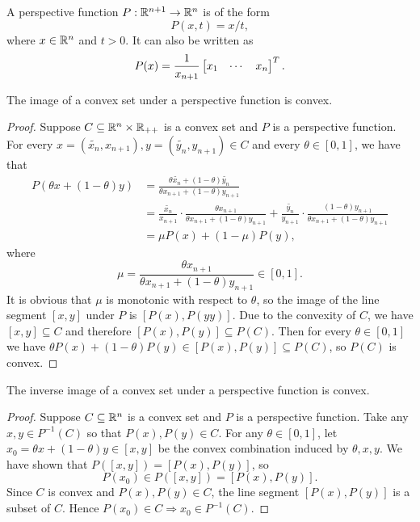 \documentclass[12pt]{article}
\begin{document}
\begin{definition}
    A \textnormal{perspective function} \(P:\mathbb R^{n+1}\to\mathbb R^n\) is of the form
    \[P(x,t)=x/t,\]
    where \(x\in\mathbb R^n\) and \(t>0\). It can also be written as
    \[P(x)=\frac{1}{x_{n+1}}\begin{bmatrix}x_1 & \cdots & x_n\end{bmatrix}^T.\]
\end{definition}

\begin{proposition}
    The image of a convex set under a perspective function is convex.
\end{proposition}
\begin{proof}
    Suppose \(C\subseteq\mathbb R^n\times\mathbb R_{++}\) is a convex set and \(P\) is a perspective function. For every \(x=\left(\tilde{x_n},x_{n+1}\right),y=\left(\tilde{y_n},y_{n+1}\right)\in C\) and every \(\theta\in[0,1]\), we have that
    \[\begin{aligned}
        P(\theta x+(1-\theta)y)
        &=\frac{\theta\tilde{x_n}+(1-\theta)\tilde{y_n}}{\theta x_{n+1}+(1-\theta)y_{n+1}}\\
        &=\frac{\tilde{x_n}}{x_{n+1}}\cdot\frac{\theta x_{n+1}}{\theta x_{n+1}+(1-\theta)y_{n+1}}+\frac{\tilde{y_n}}{y_{n+1}}\cdot\frac{(1-\theta)y_{n+1}}{\theta x_{n+1}+(1-\theta)y_{n+1}}\\
        &=\mu P(x)+(1-\mu)P(y),
    \end{aligned}\]
    where
    \[\mu=\frac{\theta x_{n+1}}{\theta x_{n+1}+(1-\theta)y_{n+1}}\in[0,1].\]
    It is obvious that \(\mu\) is monotonic with respect to \(\theta\), so the image of the line segment \([x,y]\) under \(P\) is \([P(x),P(yy)]\). Due to the convexity of \(C\), we have \([x,y]\subseteq C\) and therefore \([P(x),P(y)]\subseteq P(C)\). Then for every \(\theta\in[0,1]\) we have \(\theta P(x)+(1-\theta)P(y)\in[P(x),P(y)]\subseteq P(C)\), so \(P(C)\) is convex.
\end{proof}

\begin{proposition}
    The inverse image of a convex set under a perspective function is convex.
\end{proposition}
\begin{proof}
    Suppose \(C\subseteq\mathbb R^n\) is a convex set and \(P\) is a perspective function. Take any \(x,y\in P^{-1}(C)\) so that \(P(x),P(y)\in C\). For any \(\theta\in[0,1]\), let \(x_0=\theta x+(1-\theta)y\in[x,y]\) be the convex combination induced by \(\theta,x,y\). We have shown that \(P([x,y])=[P(x),P(y)]\), so
    \[P(x_0)\in P([x,y])=[P(x),P(y)].\]
    Since \(C\) is convex and \(P(x),P(y)\in C\), the line segment \([P(x),P(y)]\) is a subset of \(C\). Hence \(P(x_0)\in C\Rightarrow x_0\in P^{-1}(C)\).
\end{proof}
\end{document}
